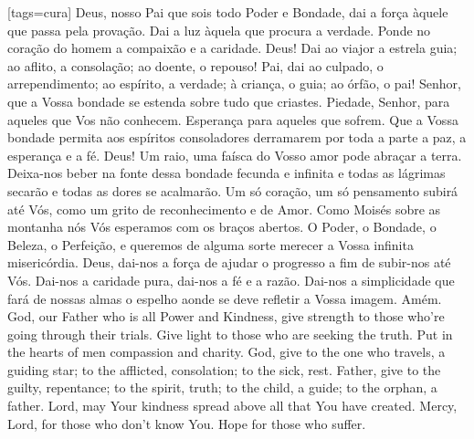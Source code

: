 {\begin{songs}{}
    \sclearpage
    [tags={cura}]
      \beginverse
        Deus, nosso Pai que sois todo Poder e Bondade, dai
        a força àquele que passa pela provação.
        \ind Dai a luz àquela que procura a verdade.
        \ind Ponde no coração do homem a compaixão e a caridade.
        \ind Deus! Dai ao viajor a estrela guia; ao aflito,
        a consolação; ao doente, o repouso!
        \ind Pai, dai ao culpado, o arrependimento; ao espírito,
        a verdade; à criança, o guia; ao órfão, o pai!
        \ind Senhor, que a Vossa bondade se estenda sobre tudo
        que criastes.
        \ind Piedade, Senhor, para aqueles que Vos não conhecem.
        \ind Esperança para aqueles que sofrem.
        \ind Que a Vossa bondade permita aos espíritos
        consoladores derramarem por toda a parte a paz, a
        esperança e a fé.
        \ind Deus! Um raio, uma faísca do Vosso amor pode abraçar
        a terra.
        \ind Deixa-nos beber na fonte dessa bondade fecunda
        e infinita e todas as lágrimas secarão e todas as
        dores se acalmarão.
        \ind Um só coração, um só pensamento subirá até Vós,
        como um grito de reconhecimento e de Amor.
        \ind Como Moisés sobre as montanha nós Vós esperamos
        com os braços abertos.
        \ind O Poder, o Bondade, o Beleza, o Perfeição, e
        queremos de alguma sorte merecer a Vossa infinita
        misericórdia.
        \ind Deus, dai-nos a força de ajudar o progresso a fim
        de subir-nos até Vós.
        \ind Dai-nos a caridade pura, dai-nos a fé e a razão.
        \ind Dai-nos a simplicidade que fará de nossas almas o
        espelho aonde se deve refletir a Vossa imagem.
        \parspace
        Amém.
      \endverse
      \forcebrk
      \vspace*{-1.1em}
      \beginverse\color{englishcolor}
        God, our Father who is all Power and Kindness,
        give strength to those who're going through
        their trials.
        \ind Give light to those who are seeking the truth.
        \ind Put in the hearts of men compassion and charity.
        \ind God, give to the one who travels, a guiding star;
        to the afflicted, consolation; to the sick, rest.
        \ind Father, give to the guilty, repentance; to the
        spirit, truth; to the child, a guide; to the orphan,
        a father.
        \ind Lord, may Your kindness spread above all that You
        have created.
        \ind Mercy, Lord, for those who don't know You.
        \ind Hope for those who suffer.

\end{songs}}

